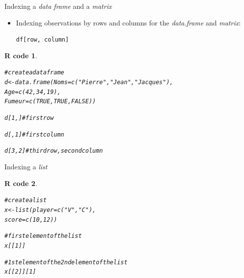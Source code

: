\documentclass[11pt]{beamer}\usepackage[]{graphicx}\usepackage[]{color}
\makeatletter
\newcommand{\hlnum}[1]{\textcolor[rgb]{0.063,0.58,0.627}{#1}}%
\newcommand{\hlstr}[1]{\textcolor[rgb]{0.063,0.58,0.627}{#1}}%
\newcommand{\hlcom}[1]{\textcolor[rgb]{0.588,0.588,0.588}{#1}}%
\newcommand{\hlstd}[1]{\textcolor[rgb]{0.196,0.196,0.196}{#1}}%
\newcommand{\hlkwb}[1]{\textcolor[rgb]{0.627,0,0.314}{#1}}%
\newcommand{\hlkwc}[1]{\textcolor[rgb]{0,0.631,0.314}{#1}}%
\newcommand{\hlkwd}[1]{\textcolor[rgb]{0.78,0.227,0.412}{#1}}%
\newenvironment{kframe}{%
 \def\at@end@of@kframe{}%
 \ifinner\ifhmode%
  \def\at@end@of@kframe{\end{minipage}}%
  \begin{minipage}{\columnwidth}%
 \fi\fi%
 \def\FrameCommand##1{\hskip\@totalleftmargin \hskip-\fboxsep
 \colorbox{shadecolor}{##1}\hskip-\fboxsep
     \hskip-\linewidth \hskip-\@totalleftmargin \hskip\columnwidth}%
 \MakeFramed {\advance\hsize-\width
   \@totalleftmargin\z@ \linewidth\hsize
   \@setminipage}}%
 {\par\unskip\endMakeFramed%
 \at@end@of@kframe}
\newenvironment{knitrout}{}{} %
\newtheorem{rcode}{R code}[section]
\newcommand{\code}[1]{\texttt{#1}}
\makeatother
\begin{document}
\begin{frame}[fragile]{Indexing a \textit{data frame} and a \textit{matrix}}

\begin{itemize}
  \setlength\itemsep{2em}
\item Indexing observations by rows and columns for the \textit{data.frame} and \textit{matrix}:
\begin{center}
\code{df[row, column]}
\end{center}

\end{itemize}
\pause 
\begin{knitrout}\small
{}\color{fgcolor}\begin{kframe}
\begin{rcode}\label{unnamed-chunk-26}\begin{alltt}
\hlcom{# create a data frame}
\hlstd{d} \hlkwb{<-} \hlkwd{data.frame}\hlstd{(}\hlkwc{Noms} \hlstd{=} \hlkwd{c}\hlstd{(}\hlstr{"Pierre"}\hlstd{,} \hlstr{"Jean"}\hlstd{,} \hlstr{"Jacques"}\hlstd{),}
\hlkwc{Age} \hlstd{=} \hlkwd{c}\hlstd{(}\hlnum{42}\hlstd{,} \hlnum{34}\hlstd{,} \hlnum{19}\hlstd{),}
\hlkwc{Fumeur} \hlstd{=} \hlkwd{c}\hlstd{(}\hlnum{TRUE}\hlstd{,} \hlnum{TRUE}\hlstd{,} \hlnum{FALSE}\hlstd{))}

\hlstd{d[}\hlnum{1}\hlstd{, ]} \hlcom{# first row}

\hlstd{d[ ,}\hlnum{1}\hlstd{]} \hlcom{# first column}

\hlstd{d[}\hlnum{3}\hlstd{,}\hlnum{2}\hlstd{]} \hlcom{# third row, second column}
\end{alltt}
\end{rcode}\end{kframe}
\end{knitrout}
\end{frame}




\begin{frame}[fragile]{Indexing a \textit{list}}

\begin{knitrout}
\color{fgcolor}\begin{kframe}
\begin{rcode}\label{unnamed-chunk-27}\begin{alltt}
\hlcom{# create a list}
\hlstd{x} \hlkwb{<-} \hlkwd{list}\hlstd{(}\hlkwc{player} \hlstd{=} \hlkwd{c}\hlstd{(}\hlstr{"V"}\hlstd{,} \hlstr{"C"}\hlstd{),}
                  \hlkwc{score} \hlstd{=} \hlkwd{c}\hlstd{(}\hlnum{10}\hlstd{,} \hlnum{12}\hlstd{))}

\hlcom{# first element of the list}
\hlstd{x[[}\hlnum{1}\hlstd{]]}

\hlcom{# 1st element of the 2nd element of the list}
\hlstd{x[[}\hlnum{2}\hlstd{]][}\hlnum{1}\hlstd{]}
\end{alltt}
\end{rcode}\end{kframe}
\end{knitrout}
\end{frame}
\end{document}
